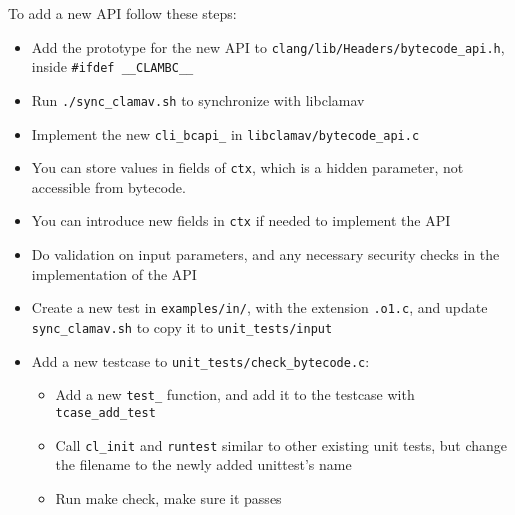 To add a new API follow these steps:
\begin{itemize}
\item Add the prototype for the new API to
\verb+clang/lib/Headers/bytecode_api.h+, inside \verb+#ifdef __CLAMBC__+
\item Run \verb+./sync_clamav.sh+ to synchronize with libclamav
\item Implement the new \verb+cli_bcapi_+ in \verb+libclamav/bytecode_api.c+
\item You can store values in fields of \verb+ctx+, which is a hidden parameter,
    not accessible from bytecode.
\item You can introduce new fields in \verb+ctx+ if needed to implement the API
\item Do validation on input parameters, and any necessary security checks in
the implementation of the API
\item Create a new test in \verb+examples/in/+, with the extension \verb+.o1.c+,
    and update \verb+sync_clamav.sh+ to copy it to \verb+unit_tests/input+
\item Add a new testcase to \verb+unit_tests/check_bytecode.c+:
  \begin{itemize}
  \item Add a new \verb+test_+ function, and add it to the testcase with
  \verb+tcase_add_test+
  \item Call \verb+cl_init+ and \verb+runtest+ similar to other existing unit
  tests, but change the filename to the newly added unittest's name
  \item Run make check, make sure it passes
  \end{itemize}
\end{itemize}

